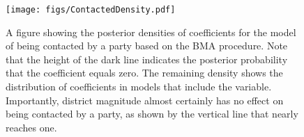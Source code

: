 \documentclass[12pt]{article}
\begin{document}
\begin{figure}[h]
\centering
\texttt{[image: figs/ContactedDensity.pdf]}
\caption{A figure showing the posterior densities of coefficients for the model of being contacted by a party based on the BMA procedure. Note that the height of the dark line indicates the posterior probability that the coefficient equals zero. The remaining density shows the distribution of coefficients in models that include the variable. Importantly, district magnitude almost certainly has no effect on being contacted by a party, as shown by the vertical line that nearly reaches one.}\label{fig:ContactedDensity}
\end{figure}

\clearpage

\singlespace \normalsize


\end{document}
